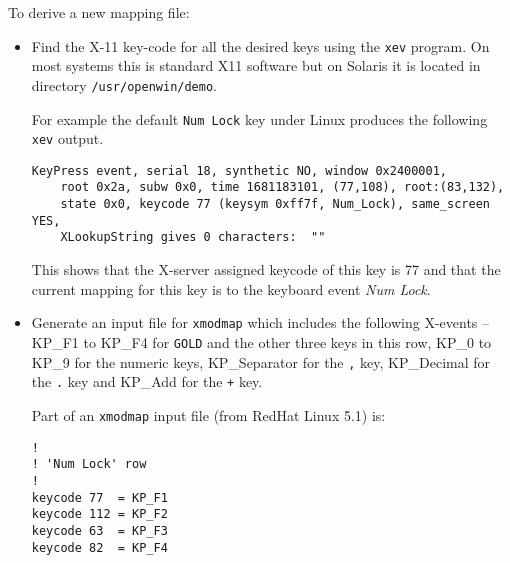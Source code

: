 \documentclass[twoside,11pt]{article}
\begin{document}
To derive a new mapping file:
\begin{itemize}

\item Find the X-11 key-code for all the desired keys using the \texttt{xev}
program. On most systems this is standard X11 software but on Solaris
it is located in directory \texttt{/usr/openwin/demo}.

For example the default \texttt{Num Lock} key under Linux produces the
following \texttt{xev} output.
\begin{verbatim}
KeyPress event, serial 18, synthetic NO, window 0x2400001,
    root 0x2a, subw 0x0, time 1681183101, (77,108), root:(83,132),
    state 0x0, keycode 77 (keysym 0xff7f, Num_Lock), same_screen YES,
    XLookupString gives 0 characters:  ""
\end{verbatim}

This shows that the X-server assigned keycode of this key is 77 and that the 
current mapping for this key is to the keyboard event \textit{Num Lock}.

\item Generate an input file for \texttt{xmodmap} which includes the following
X-events -- KP\_F1 to KP\_F4 for \texttt{GOLD} and the other three keys in
this row, KP\_0 to KP\_9 for the numeric keys, KP\_Separator for the 
\texttt{,} key, 
KP\_Decimal for the \texttt{.} key and KP\_Add for the \texttt{+} key.

Part of an \texttt{xmodmap} input file (from RedHat Linux 5.1) is:
\begin{verbatim}
!
! 'Num Lock' row
!
keycode 77  = KP_F1
keycode 112 = KP_F2
keycode 63  = KP_F3
keycode 82  = KP_F4
\end{verbatim}

\end{itemize}
\end{document}
